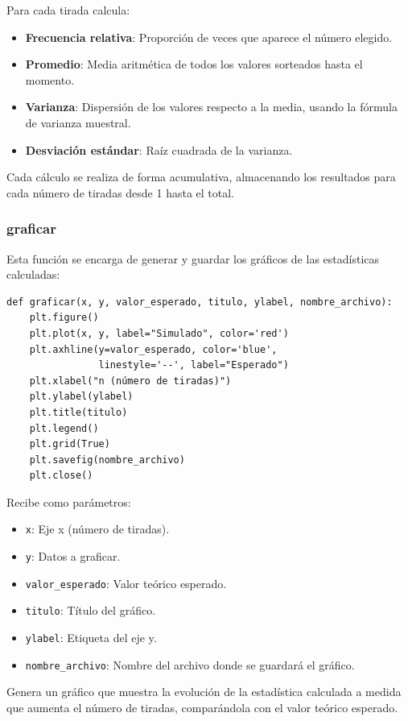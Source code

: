 \documentclass{article}
\begin{document}
Para cada tirada calcula:
\begin{itemize}
    \item \textbf{Frecuencia relativa}: Proporción de veces que aparece el número elegido.
    \item \textbf{Promedio}: Media aritmética de todos los valores sorteados hasta el momento.
    \item \textbf{Varianza}: Dispersión de los valores respecto a la media, usando la fórmula de varianza muestral.
    \item \textbf{Desviación estándar}: Raíz cuadrada de la varianza.
\end{itemize}

Cada cálculo se realiza de forma acumulativa, almacenando los resultados para cada número de tiradas desde 1 hasta el total.

\subsubsection{graficar}
Esta función se encarga de generar y guardar los gráficos de las estadísticas calculadas:

\begin{verbatim}
def graficar(x, y, valor_esperado, titulo, ylabel, nombre_archivo):
    plt.figure()
    plt.plot(x, y, label="Simulado", color='red')
    plt.axhline(y=valor_esperado, color='blue', 
                linestyle='--', label="Esperado")
    plt.xlabel("n (número de tiradas)")
    plt.ylabel(ylabel)
    plt.title(titulo)
    plt.legend()
    plt.grid(True)
    plt.savefig(nombre_archivo)
    plt.close()
\end{verbatim}

Recibe como parámetros:
\begin{itemize}
    \item \texttt{x}: Eje x (número de tiradas).
    \item \texttt{y}: Datos a graficar.
    \item \texttt{valor\_esperado}: Valor teórico esperado.
    \item \texttt{titulo}: Título del gráfico.
    \item \texttt{ylabel}: Etiqueta del eje y.
    \item \texttt{nombre\_archivo}: Nombre del archivo donde se guardará el gráfico.
\end{itemize}

Genera un gráfico que muestra la evolución de la estadística calculada a medida que aumenta el número de tiradas, comparándola con el valor teórico esperado.
\end{document}
